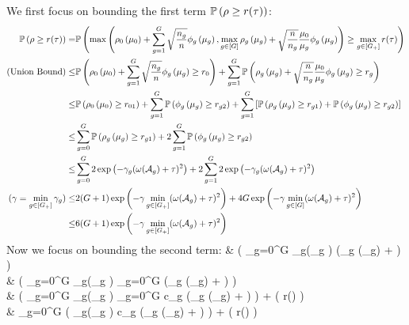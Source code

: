 	We first focus on bounding the first term $\mathbb{P} \left( \rho \geq r(\tau) \right)$:
	{\small \begin{align}	
	\nr 	
	\pr \left( \rho \geq r(\tau) \right)	
	=& \pr \left( \max\left(\rho_0\left(\mu_0\right) + \sum_{g=1}^{G} \sqrt{\frac{n_g}{n}} \phi_g\left(\mu_g\right), \max_{g \in [G]} \rho_g\left(\mu_g\right) + \sqrt{\frac{n}{n_g}} \frac{\mu_0}{\mu_g}\phi_g\left(\mu_g\right)\right) \geq \max_{g \in [G_+] } r(\tau)  \right) 
	\\ \nr 
	(\text{Union Bound}) \leq& \pr \left(\rho_0\left(\mu_0 \right) + \sum_{g=1}^{G} \sqrt{\frac{n_g}{n}} \phi_g\left(\mu_g\right) \geq r_0  \right)   + \sum_{g=1}^{G} \pr \left( \rho_g\left(\mu_g\right) + \sqrt{\frac{n}{n_g}} \frac{\mu_0}{\mu_g}\phi_g\left(\mu_g\right) \geq r_g  \right)
	\\ \nr 
	\leq& \pr \left(\rho_0\left(\mu_0 \right) \geq r_{01} \right) + \sum_{g=1}^{G} \pr\left( \phi_g\left(\mu_g\right) \geq r_{g2}  \right)   + \sum_{g=1}^{G} \left[\pr \left( \rho_g\left(\mu_g\right) \geq r_{g1} \right) + \pr \left(\phi_g\left(\mu_g\right) \geq r_{g2}  \right)\right]
	\\ \nr 
	\leq& \sum_{g=0}^{G} \pr \left( \rho_g\left(\mu_g\right) \geq r_{g1} \right)  + 2\sum_{g=1}^{G} \pr\left( \phi_g\left(\mu_g\right) \geq r_{g2}  \right)   
	\\ \nr 	
	\leq& \sum_{g=0}^{G} 2 \exp\left( -\gamma_g (\omega(\cA_g) + \tau)^2  \right)  + 2\sum_{g=1}^{G} 2\exp\left( -\gamma_g (\omega(\cA_g) + \tau)^2  \right)      
	\\ \nr 	
	(\gamma = \min_{g \in [G_+]} \gamma_g) \leq& 2(G+1)\exp\left( -\gamma \min_{g \in [G_+]} (\omega(\cA_g) + \tau)^2  \right)  + 4 G \exp\left( -\gamma \min_{g \in [G]} (\omega(\cA_g) + \tau)^2  \right)      
	\\  \label{eq:part1} 
	\leq& 6 (G+1)\exp\left( -\gamma \min_{g \in [G_+]} (\omega(\cA_g) + \tau)^2  \right)  
	\end{align}	}
	Now we focus on bounding the second term:
	{\small\bea
	\nr 	
	& \pr \left(   \sum_{g=0}^{G}  \eta_g\left(\mu_g \right)  
	\geq {} (\max_{g \in [G_+]} \omega(\cA_g) + \tau) \right)
	\\ \nr 
	\leq& \pr \left(   \sum_{g=0}^{G}  \eta_g\left(\mu_g \right)  
	\geq {} \sum_{g=0}^{G}  (\max_{g \in [G_+]} \omega(\cA_g) + \tau) \right) 
	\\ \nr 
	\leq& \pr \left( \sum_{g=0}^{G}  \eta_g\left(\mu_g \right)  \geq \sum_{g=0}^{G} c_g  (\max_{g \in [G_+]} \omega(\cA_g) + \tau) \right) 
	+ \pr \left( \rho \geq r(\tau) \right)	
	\\ \label{eq:part2}
	\leq& \sum_{g=0}^{G} \pr \left(    \eta_g\left(\mu_g \right)  \geq c_g  (\max_{g \in [G_+]} \omega(\cA_g) + \tau) \right) 
	+ \pr \left( \rho \geq r(\tau) \right)		
	\eea}
